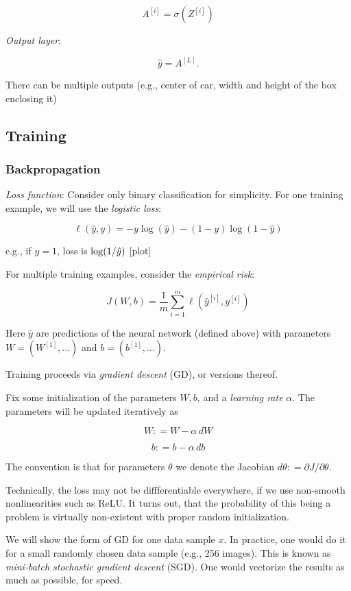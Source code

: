 \documentclass[english]{article}
\begin{document}
$$A^{[i]}  = \sigma(Z^{[i]})$$
\item  
\emph{Output layer}:  

$$\hat y = A^{[L]}.$$

There can be multiple outputs (e.g., center of car, width and height of the box enclosing it)

\eenum

\eenum

\subsection{Training}
\subsubsection{Backpropagation}

\benum
\item \emph{Loss function}: Consider only binary classification for simplicity. For one training example, we will use the \emph{logistic loss}: 

$$\ell(\hat y,y) = - y \log(\hat y) - (1-y) \log(1-\hat y)$$


e.g., if $y = 1$, loss is $\log(1/\hat{y})$ [plot]

For multiple training examples, consider the \emph{empirical risk}: 

$$J(W,b) = \frac{1}{m} \sum_{i=1}^m\ell(\hat y^{[i]},y^{[i]})$$

Here $\hat y$ are predictions of the neural network (defined above) with parameters $W  = (W^{[1]}, \ldots)$ and $b  = (b^{[1]}, \ldots)$. 

\item Training proceeds via \emph{gradient descent} (GD), or versions thereof. 

Fix some initialization of the parameters $W,b$, and a \emph{learning rate} $\alpha$. The parameters will be updated iteratively as 

$$W: = W - \alpha\, dW$$

$$b: = b - \alpha\, db$$

The convention is that for parameters $\theta$ we denote the Jacobian $d\theta: = \partial J/\partial\theta$. 

Technically, the loss may not be diffferentiable everywhere, if we use non-smooth nonlinearities such as ReLU. It turns out, that the probability of this being a problem is virtually non-existent with proper random initialization. 

\item We will show the form of GD for one data sample $x$. In practice, one would do it for a small randomly chosen data sample  (e.g., 256 images). This is known as \emph{mini-batch stochastic gradient descent} (SGD). One would vectorize the results as much as possible, for speed. 
\end{document}
